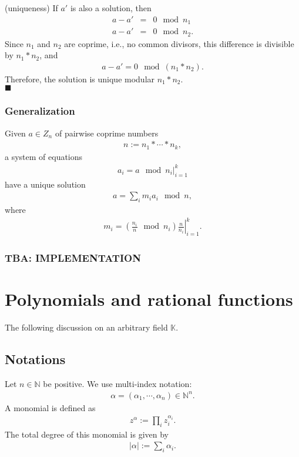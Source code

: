 \documentclass[11pt]{book}
\begin{document}
(uniqueness)
If $a'$ is also a solution, then
\begin{eqnarray}
a - a' &=& 0 \mod n_1 \\
a - a' &=& 0 \mod n_2.
\end{eqnarray}
Since $n_1$ and $n_2$ are coprime, i.e., no common divisors, this difference is divisible by $n_1*n_2$, and
\begin{eqnarray}
a - a' = 0 \mod (n_1 * n_2).
\end{eqnarray}
Therefore, the solution is unique modular $n_1*n_2$. \\
$\blacksquare$

\subsubsection{Generalization}
Given $a \in Z_n$ of pairwise coprime numbers
\begin{eqnarray}
n := n_1 * \cdots * n_k,
\end{eqnarray}
a system of equations
\begin{eqnarray}
\left. a_i = a \mod n_i \right|_{i=1}^k
\end{eqnarray}
have a unique solution
\begin{eqnarray}
a = \sum_i m_i a_i \mod n,
\end{eqnarray}
where
\begin{eqnarray}
\left. m_i = \left( \frac{n_i}{n} \mod n_i \right) \frac{n}{n_i} \right|_{i=1}^k.
\end{eqnarray}

\subsubsection{TBA: IMPLEMENTATION}

\section{Polynomials and rational functions}
The following discussion on an arbitrary field $\mathbb{K}$.

\subsection{Notations}
Let $n \in \mathbb{N}$ be positive. 
We use multi-index notation:
\begin{eqnarray}
\alpha = (\alpha_1, \cdots, \alpha_n) \in \mathbb{N}^n.
\end{eqnarray}
A monomial is defined as
\begin{eqnarray}
z^\alpha := \prod_i z_i^{\alpha_i}.
\end{eqnarray}
The total degree of this monomial is given by
\begin{eqnarray}
|\alpha| := \sum_i \alpha_i.
\end{eqnarray}
\end{document}
